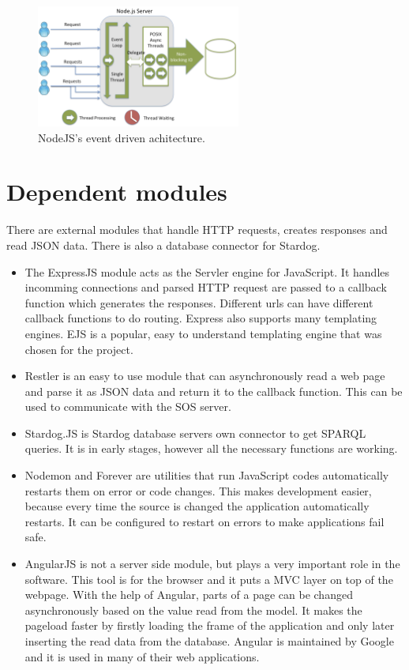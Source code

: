 \begin{figure}[h]
\centering
\includegraphics[width=0.6\textwidth]{figures/node.png}
\caption{NodeJS's event driven achitecture.\label{fig:node}}
\end{figure}

\section{Dependent modules}

There are external modules that handle HTTP requests, creates responses and read JSON data. There is also a database connector for Stardog. 
\begin{itemize}

\item The ExpressJS module acts as the Servler engine for JavaScript. It handles incomming connections and parsed HTTP request are passed to a callback function which generates the responses. Different urls can have different callback functions to do routing. Express also supports many templating engines. EJS is a popular, easy to understand templating engine that was chosen for the project.

\item Restler is an easy to use module that can asynchronously read a web page and parse it as JSON data and return it to the callback function. This can be used to communicate with the SOS server.

\item Stardog.JS is Stardog database servers own connector to get SPARQL queries. It is in early stages, however all the necessary functions are working. 

\item Nodemon and Forever are utilities that run JavaScript codes automatically restarts them on error or code changes. This makes development easier, because every time the source is changed the application automatically restarts. It can be configured to restart on errors to make applications fail safe.

\item AngularJS is not a server side module, but plays a very important role in the software. This tool is for the browser and it puts a MVC layer on top of the webpage. With the help of Angular, parts of a page can be changed asynchronously based on the value read from the model. It makes the pageload faster by firstly loading the frame of the application and only later inserting the read data from the database. Angular is maintained by Google and it is used in many of their web applications.

\end{itemize}

